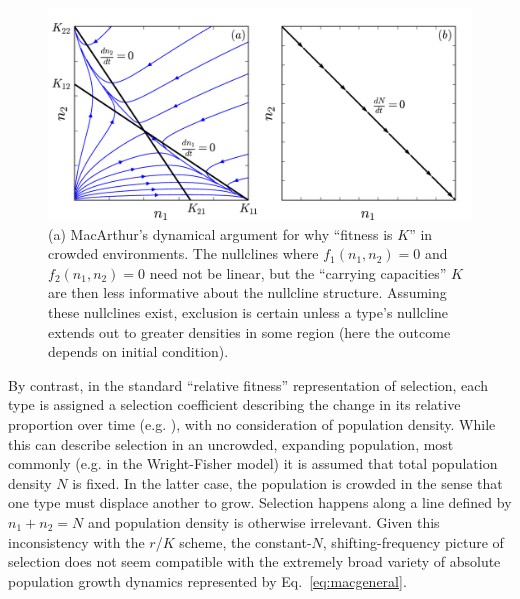 \documentclass[11pt]{article}
\begin{document}
\begin{figure}
\centering
\includegraphics[scale=0.8]{Kplot.pdf}
\caption{\label{fig:Ksel} (a) MacArthur's dynamical argument for why ``fitness is $K$'' in crowded environments. The nullclines where $f_1(n_1,n_2)=0$ and $f_2(n_1,n_2)=0$ need not be linear, but the ``carrying capacities'' $K$ are then less informative about the nullcline structure. Assuming these nullclines exist, exclusion is certain unless a type's nullcline extends out to greater densities in some region (here the outcome depends on initial condition).}
\end{figure}

By contrast, in the standard ``relative fitness'' representation of selection, each type is assigned a selection coefficient describing the change in its relative proportion over time (e.g. \cite[pp. 468]{barton_2007}), with no consideration of population density. While this can describe selection in an uncrowded, expanding population, most commonly (e.g. in the Wright-Fisher model) it is assumed that total population density $N$ is fixed. In the latter case, the population is crowded in the sense that one type must displace another to grow. Selection happens along a line defined by $n_1+n_2=N$ and population density is otherwise irrelevant. Given this inconsistency with the $r$/$K$ scheme, the constant-$N$, shifting-frequency picture of selection does not seem compatible with the extremely broad variety of absolute population growth dynamics represented by Eq.~\eqref{eq:macgeneral}.
\end{document}
